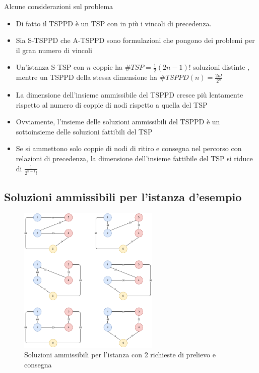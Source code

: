 \documentclass[9pt]{beamer}
\begin{document}
\begin{frame}{Alcune considerazioni sul problema}
	
	\begin{itemize}
	
		\item
		Di fatto il TSPPD è un TSP con in più i vincoli di precedenza.

		\item
		Sia S-TSPPD che A-TSPPD sono formulazioni che pongono dei problemi per il gran numero di vincoli

		\item
		Un'istanza S-TSP con $n$ coppie ha \( \#TSP = \frac{1}{2} (2n -1)!\) soluzioni distinte \cite{lin1965computer}, mentre un TSPPD della stessa dimensione ha \(\#TSPPD(n) = \frac{2n!}{2^n}\) \cite{ruland1997pickup}
		
		\item
		La dimensione dell'insieme ammissibile del TSPPD cresce più lentamente rispetto al numero di coppie di nodi rispetto a quella del TSP

		\item
		Ovviamente, l'insieme delle soluzioni ammissibili del TSPPD è un sottoinsieme delle soluzioni fattibili del TSP
		
		\item
		Se si ammettono solo coppie di nodi di ritiro e consegna nel percorso con relazioni di precedenza, la dimensione dell'insieme fattibile del TSP si riduce di \( \frac{1}{2^{n-1}!} \) \cite{ruland1997pickup}
	\end{itemize}

\end{frame}

\subsection{Soluzioni ammissibili per l'istanza d'esempio}
\begin{frame}{\subsecname}

	\begin{figure}[h]
		\centering
		\includegraphics[width=0.6\textwidth]
		{../images/graph-all-solutions-tsppd-with-two-customers}	
		\caption{Soluzioni ammissibili per l'istanza con 2 richieste di prelievo e consegna}
	\end{figure}

\end{frame}
\end{document}
